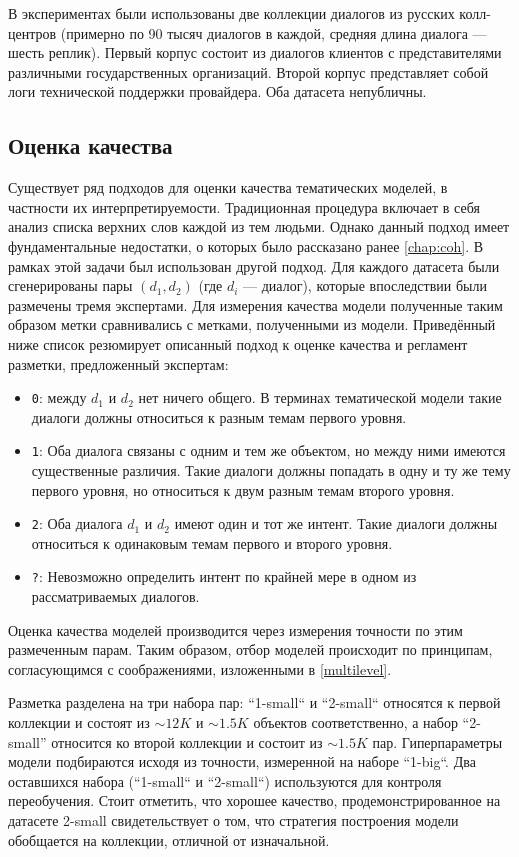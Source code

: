 В экспериментах были использованы две коллекции диалогов из русских колл-центров (примерно по 90 тысяч диалогов в каждой, средняя длина диалога --- шесть реплик). Первый корпус состоит из диалогов клиентов с представителями различными государственных организаций. Второй корпус представляет собой логи технической поддержки провайдера. Оба датасета непубличны.

\subsection{Оценка качества}

Существует ряд подходов для оценки качества тематических моделей, в частности их интерпретируемости. Традиционная процедура включает в себя анализ списка верхних слов каждой из тем людьми. Однако данный подход имеет фундаментальные недостатки, о которых было рассказано ранее \ref{chap:coh}. В рамках этой задачи был использован другой подход.
Для каждого датасета были сгенерированы пары $(d_1, d_2)$ (где $d_i$ --- диалог), которые впоследствии были размечены тремя экспертами. Для измерения качества модели полученные таким образом метки сравнивались с метками, полученными из модели.
Приведённый ниже список резюмирует описанный подход к оценке качества и регламент разметки, предложенный экспертам:
\begin{itemize}
    \item \texttt{0}: между $d_1$ и $d_2$ нет ничего общего. В терминах тематической модели такие диалоги должны относиться к разным темам первого уровня.
    \item \texttt{1}: Оба диалога связаны с одним и тем же объектом, но между ними имеются существенные различия. Такие диалоги должны попадать в одну и ту же тему первого уровня, но относиться к двум разным темам второго уровня.
    \item \texttt{2}: Оба диалога $d_1$ и $d_2$ имеют один и тот же интент. Такие диалоги должны относиться к одинаковым темам первого и второго уровня.
    \item \texttt{?}: Невозможно определить интент по крайней мере в одном из рассматриваемых диалогов.
\end{itemize}

Оценка качества моделей производится через измерения точности по этим размеченным парам. Таким образом, отбор моделей происходит по принципам, согласующимся с соображениями, изложенными в \ref{multilevel}.

Разметка разделена на три набора пар: ``1-small`` и ``2-small`` относятся к первой коллекции и состоят из $\sim\!12K$ и $\sim1.5K$ объектов соответственно, а набор ``2-small'' относится ко второй коллекции и состоит из $\sim\!1.5K$ пар. Гиперпараметры модели подбираются исходя из точности, измеренной на  наборе ``1-big``. Два оставшихся набора (``1-small`` и ``2-small``) используются для контроля переобучения. Стоит отметить, что хорошее качество, продемонстрированное на датасете 2-small свидетельствует о том, что стратегия построения модели обобщается на коллекции, отличной от изначальной.



